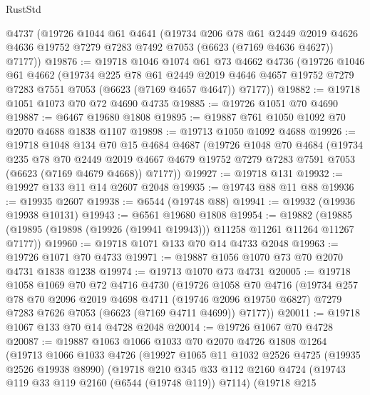\begin{lexlean}{RustStd}
\begin{coremodule}
    @4737
    (@19726
      @1044
      @61
      @4641
      (@19734
        @206
        @78
        @61
        @2449
        @2019
        @4626
        @4636
        @19752
        @7279
        @7283
        @7492
        @7053
        (@6623 (@7169 @4636 @4627))
        @7177))
@19876 := @19718
    @1046
    @1074
    @61
    @73
    @4662
    @4736
    (@19726
      @1046
      @61
      @4662
      (@19734
        @225
        @78
        @61
        @2449
        @2019
        @4646
        @4657
        @19752
        @7279
        @7283
        @7551
        @7053
        (@6623 (@7169 @4657 @4647))
        @7177))
@19882 := @19718 @1051 @1073 @70 @72 @4690 @4735
@19885 := @19726 @1051 @70 @4690
@19887 := @6467 @19680 @1808
@19895 := @19887 @761 @1050 @1092 @70 @2070 @4688 @1838 @1107
@19898 := @19713 @1050 @1092 @4688
@19926 := @19718
    @1048
    @134
    @70
    @15
    @4684
    @4687
    (@19726
      @1048
      @70
      @4684
      (@19734
        @235
        @78
        @70
        @2449
        @2019
        @4667
        @4679
        @19752
        @7279
        @7283
        @7591
        @7053
        (@6623 (@7169 @4679 @4668))
        @7177))
@19927 := @19718 @131
@19932 := @19927 @133 @11 @14 @2607 @2048
@19935 := @19743 @88 @11 @88
@19936 := @19935 @2607
@19938 := @6544 (@19748 @88)
@19941 := @19932 (@19936 @19938 @10131)
@19943 := @6561 @19680 @1808
@19954 := @19882
    (@19885 (@19895 (@19898 (@19926 (@19941 @19943))) @11258 @11261 @11264 @11267 @7177))
@19960 := @19718 @1071 @133 @70 @14 @4733 @2048
@19963 := @19726 @1071 @70 @4733
@19971 := @19887 @1056 @1070 @73 @70 @2070 @4731 @1838 @1238
@19974 := @19713 @1070 @73 @4731
@20005 := @19718
    @1058
    @1069
    @70
    @72
    @4716
    @4730
    (@19726
      @1058
      @70
      @4716
      (@19734
        @257
        @78
        @70
        @2096
        @2019
        @4698
        @4711
        (@19746 @2096 @19750 @6827)
        @7279
        @7283
        @7626
        @7053
        (@6623 (@7169 @4711 @4699))
        @7177))
@20011 := @19718 @1067 @133 @70 @14 @4728 @2048
@20014 := @19726 @1067 @70 @4728
@20087 := @19887
    @1063
    @1066
    @1033
    @70
    @2070
    @4726
    @1808
    @1264
    (@19713
      @1066
      @1033
      @4726
      (@19927
        @1065
        @11
        @1032
        @2526
        @4725
        (@19935 @2526 @19938 @8990)
        (@19718
          @210
          @345
          @33
          @112
          @2160
          @4724
          (@19743 @119 @33 @119 @2160 (@6544 (@19748 @119)) @7114)
          (@19718
            @215

\end{coremodule}
\end{lexlean}
